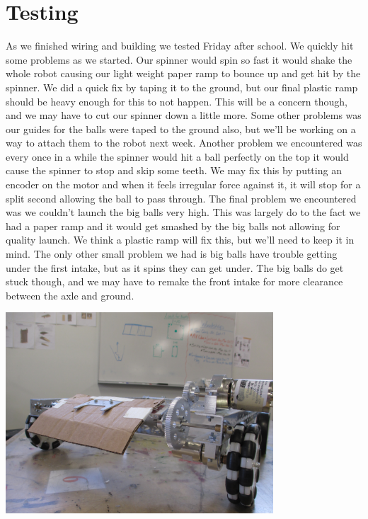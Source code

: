 \section*{Testing}
As we finished wiring and building we tested Friday after school. We quickly hit some problems as we started. Our spinner would spin so fast it would shake the whole robot causing our light weight paper ramp to bounce up and get hit by the spinner. We did a quick fix by taping it to the ground, but our final plastic ramp should be heavy enough for this to not happen. This will be a concern though, and we may have to cut our spinner down a little more. Some other problems was our guides for the balls were taped to the ground also, but we’ll be working on a way to attach them to the robot next week. Another problem we encountered was every once in a while the spinner would hit a ball perfectly on the top it would cause the spinner to stop and skip some teeth. We may fix this by putting an encoder on the motor and when it feels irregular force against it, it will stop for a split second allowing the ball to pass through. The final problem we encountered was we couldn’t launch the big balls very high. This was largely do to the fact we had a paper ramp and it would get smashed by the big balls not allowing for quality launch. We think a plastic ramp will fix this, but we’ll need to keep it in mind. The only other small problem we had is big balls have trouble getting under the first intake, but as it spins they can get under. The big balls do get stuck though, and we may have to remake the front intake for more clearance between the axle and ground. 

\begin{center}
\includegraphics[width=10cm]{./Entries/Images/NewIntake.jpg}
\end{center}
